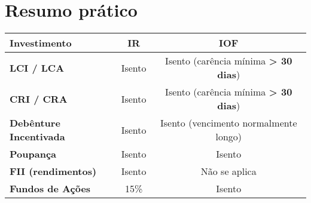 \section{Resumo prático}
\begin{center}
\begin{tabular}{|p{4.8cm}|c|c|}
\hline
\textbf{Investimento} & \textbf{IR} & \textbf{IOF} \\
\hline
\textbf{LCI / LCA} & Isento & Isento (carência mínima \textbf{> 30 dias}) \\
\hline
\textbf{CRI / CRA} & Isento & Isento (carência mínima \textbf{> 30 dias}) \\
\hline
\textbf{Debênture Incentivada} & Isento & Isento (vencimento normalmente longo) \\
\hline
\textbf{Poupança} & Isento & Isento \\
\hline
\textbf{FII (rendimentos)} & Isento & Não se aplica \\
\hline
\textbf{Fundos de Ações} & 15\% & Isento \\
\hline
\end{tabular}
\end{center}